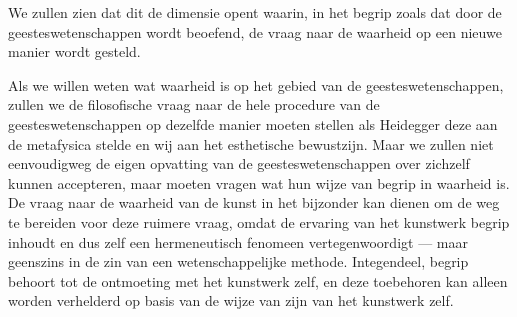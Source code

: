 We zullen zien dat dit de dimensie opent waarin, in het begrip zoals dat door de geesteswetenschappen wordt beoefend, de vraag naar de waarheid op een nieuwe manier wordt gesteld.

Als we willen weten wat waarheid is op het gebied van de geesteswetenschappen, zullen we de filosofische vraag naar de hele procedure van de geesteswetenschappen op dezelfde manier moeten stellen als Heidegger deze aan de metafysica stelde en wij aan het esthetische bewustzijn. Maar we zullen niet eenvoudigweg de eigen opvatting van de geesteswetenschappen over zichzelf kunnen accepteren, maar moeten vragen wat hun wijze van begrip in waarheid is. De vraag naar de waarheid van de kunst in het bijzonder kan dienen om de weg te bereiden voor deze ruimere vraag, omdat de ervaring van het kunstwerk begrip inhoudt en dus zelf een hermeneutisch fenomeen vertegenwoordigt — maar geenszins in de zin van een wetenschappelijke methode. Integendeel, begrip behoort tot de ontmoeting met het kunstwerk zelf, en deze toebehoren kan alleen worden verhelderd op basis van de wijze van zijn van het kunstwerk zelf.






